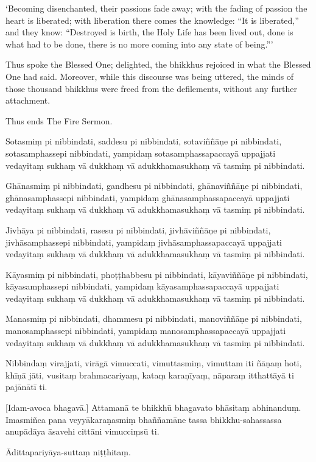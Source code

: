 ‘Becoming disenchanted, their passions fade away; with the fading of
passion the heart is liberated; with liberation there comes the
knowledge: “It is liberated,” and they know: “Destroyed is birth, the
Holy Life has been lived out, done is what had to be done, there is no
more coming into any state of being.”\thinspace ’

\enlargethispage{\baselineskip}

Thus spoke the Blessed One; delighted, the bhikkhus rejoiced in what the
Blessed One had said. Moreover, while this discourse was being uttered, the
minds of those thousand bhikkhus were freed from the defilements,
without any further attachment.

Thus ends The Fire Sermon.

\clearpage

\paliText
\markboth{\paliTitle}{\rightmark}

Sotasmiṃ pi nibbindati, saddesu pi nibbindati, sotaviññāṇe pi
nibbindati, sotasamphassepi nibbindati, yampidaṃ sotasamphassapaccayā
uppajjati vedayitaṃ sukhaṃ vā dukkhaṃ vā adukkhamasukhaṃ vā tasmiṃ pi
nibbindati.

Ghānasmiṃ pi nibbindati, gandhesu pi nibbindati, ghānaviññāṇe pi
nibbindati, ghānasamphassepi nibbindati, yampidaṃ ghānasamphassapaccayā
uppajjati vedayitaṃ sukhaṃ vā dukkhaṃ vā adukkhamasukhaṃ vā tasmiṃ pi
nibbindati.

Jivhāya pi nibbindati, rasesu pi nibbindati, jivhāviññāṇe pi nibbindati,
jivhāsamphassepi nibbindati, yampidaṃ jivhāsamphassapaccayā uppajjati
vedayitaṃ sukhaṃ vā dukkhaṃ vā adukkhamasukhaṃ vā tasmiṃ pi nibbindati.

Kāyasmiṃ pi nibbindati, phoṭṭhabbesu pi nibbindati, kāyaviññāṇe pi
nibbindati, kāyasamphassepi nibbindati, yampidaṃ kāyasamphassapaccayā
uppajjati vedayitaṃ sukhaṃ vā dukkhaṃ vā adukkhamasukhaṃ vā tasmiṃ pi
nibbindati.

Manasmiṃ pi nibbindati, dhammesu pi nibbindati, manoviññāṇe pi
nibbindati, manosamphassepi nibbindati, yampidaṃ manosamphassapaccayā
uppajjati vedayitaṃ sukhaṃ vā dukkhaṃ vā adukkhamasukhaṃ vā tasmiṃ pi
nibbindati.

Nibbindaṃ virajjati, virāgā vimuccati, vimuttasmiṃ, vimuttam iti ñāṇaṃ
hoti, khīṇā jāti, vusitaṃ brahmacariyaṃ, kataṃ karaṇīyaṃ, nāparaṃ
itthattāyā ti pajānātī ti.

\enlargethispage{\baselineskip}

[Idam-avoca bhagavā.] Attamanā te bhikkhū bhagavato bhāsitaṃ abhinanduṃ.
Imasmiñca pana veyyākaraṇasmiṃ bhaññamāne tassa bhikkhu-sahassassa
anupādāya āsavehi cittāni vimucciṃsū ti.

Ādittapariyāya-suttaṃ niṭṭhitaṃ.

\resumeNormalText

